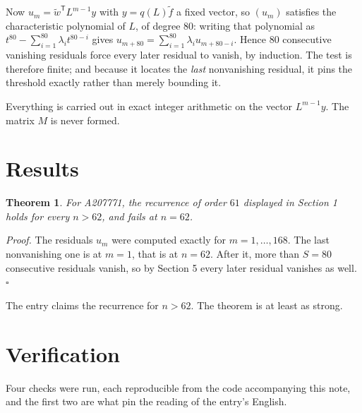 \documentclass[11pt]{article}
\newtheorem{theorem}{Theorem}
\theoremstyle{definition}
\begin{document}
Now $u_m = \tilde w^{\mathsf T} L^{m-1} y$ with $y = q(L)\tilde f$ a fixed vector, so $(u_m)$ satisfies the characteristic polynomial of $L$, of degree $80$: writing that polynomial as $t^{80} - \sum_{i=1}^{80} \lambda_i t^{80-i}$ gives $u_{m+80} = \sum_{i=1}^{80} \lambda_i u_{m+80-i}$. Hence $80$ consecutive vanishing residuals force every later residual to vanish, by induction. The test is therefore finite; and because it locates the {\itshape last} nonvanishing residual, it pins the threshold exactly rather than merely bounding it.

Everything is carried out in exact integer arithmetic on the vector $L^{m-1}y$. The matrix $M$ is never formed.

\section{Results}

\begin{theorem} For A207771, the recurrence of order $61$ displayed in Section 1 holds for every $n > 62$, and fails at $n = 62$.\end{theorem}

{\itshape Proof.} The residuals $u_m$ were computed exactly for $m = 1,\dots,168$. The last nonvanishing one is at $m = 1$, that is at $n = 62$. After it, more than $S = 80$ consecutive residuals vanish, so by Section 5 every later residual vanishes as well. $\square$

The entry claims the recurrence for $n > 62$. The theorem is at least as strong.

\section{Verification}

Four checks were run, each reproducible from the code accompanying this note, and the first two are what pin the reading of the entry's English.
\end{document}
